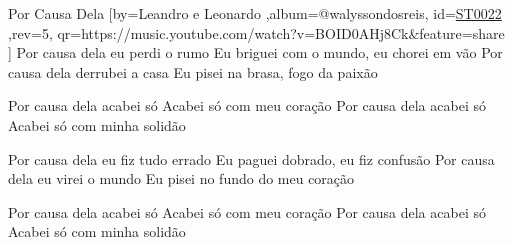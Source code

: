 \beginsong
{Por Causa Dela %
}[by={Leandro e Leonardo %
},album={@walyssondosreis},
id={\href{https://music.youtube.com/watch?v=BOID0AHj8Ck&feature=share %
}{ST0022 %
}},rev={5}, %
qr={https://music.youtube.com/watch?v=BOID0AHj8Ck&feature=share %
}]
\beginverse
Por causa dela eu perdi o rumo
Eu briguei com o mundo, eu chorei em vão
Por causa dela derrubei a casa
Eu pisei na brasa, fogo da paixão
\endverse

\beginverse
Por causa dela acabei só
Acabei só com meu coração
Por causa dela acabei só
Acabei só com minha solidão
\endverse

\beginverse
Por causa dela eu fiz tudo errado
Eu paguei dobrado, eu fiz confusão
Por causa dela eu virei o mundo
Eu pisei no fundo do meu coração
\endverse

\beginverse
Por causa dela acabei só
Acabei só com meu coração
Por causa dela acabei só
Acabei só com minha solidão
\endverse

